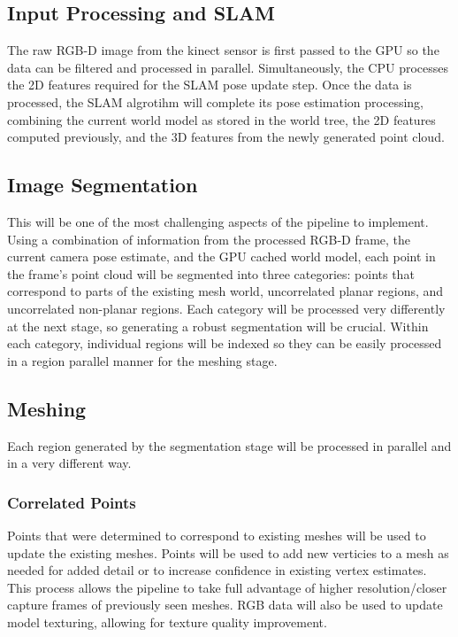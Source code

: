 \documentclass[english]{article}
\begin{document}
\subsection{Input Processing and SLAM}
The raw RGB-D image from the kinect sensor is first passed to the GPU so the data can be filtered and processed in parallel. Simultaneously, the CPU processes the 2D features required for the SLAM pose update step. Once the data is processed, the SLAM algrotihm will complete its pose estimation processing, combining the current world model as stored in the world tree, the 2D features computed previously, and the 3D features from the newly generated point cloud.

\subsection{Image Segmentation}

This will be one of the most challenging aspects of the pipeline to implement. Using a combination of information from the processed RGB-D frame, the current camera pose estimate, and the GPU cached world model, each point in the frame's point cloud will be segmented into three categories: points that correspond to parts of the existing mesh world, uncorrelated planar regions, and uncorrelated non-planar regions. Each category will be processed very differently at the next stage, so generating a robust segmentation will be crucial. Within each category, individual regions will be indexed so they can be easily processed in a region parallel manner for the meshing stage.

\subsection{Meshing}
Each region generated by the segmentation stage will be processed in parallel and in a very different way.
\subsubsection{Correlated Points}
Points that were determined to correspond to existing meshes will be used to update the existing meshes. Points will be used to add new verticies to a mesh as needed for added detail or to increase confidence in existing vertex estimates. This process allows the pipeline to take full advantage of higher resolution/closer capture frames of previously seen meshes. RGB data will also be used to update model texturing, allowing for texture quality improvement.
\end{document}

